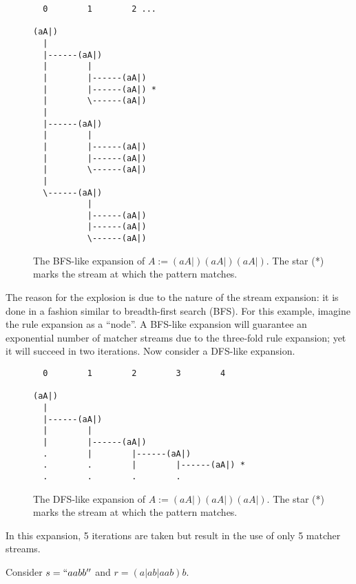 \begin{figure}[h]
\begin{center}
\begin{BVerbatim}
  0        1        2 ...

(aA|)
  |
  |------(aA|)
  |        |
  |        |------(aA|)
  |        |------(aA|) *
  |        \------(aA|)
  |
  |------(aA|)
  |        |
  |        |------(aA|)
  |        |------(aA|)
  |        \------(aA|)
  |
  \------(aA|)
           |
           |------(aA|)
           |------(aA|)
           \------(aA|)
\end{BVerbatim}
\end{center}
\caption{The BFS-like expansion of $A := (aA|)(aA|)(aA|)$. The star 
(*) marks the stream at which the pattern matches.}
\end{figure}


The reason for the explosion is due to the nature of the stream expansion: it
is done in a fashion similar to breadth-first search (BFS).  For this example,
imagine the rule expansion as a ``node''.  A BFS-like expansion will guarantee
an exponential number of matcher streams due to the three-fold rule expansion;
yet it will succeed in two iterations.  Now consider a DFS-like expansion.

\begin{figure}[h]
\begin{center}
\begin{BVerbatim}
  0        1        2        3        4

(aA|)
  |
  |------(aA|)
  |        |
  |        |------(aA|)
  .        |        |------(aA|)
  .        .        |        |------(aA|) *
  .        .        .        .
\end{BVerbatim}
\end{center}
\caption{The DFS-like expansion of $A := (aA|)(aA|)(aA|)$. The star 
(*) marks the stream at which the pattern matches.}
\end{figure}

In this expansion, 5 iterations are taken but result in the use of only 5
matcher streams. 



\pagebreak

Consider $s = ``aabb''$ and $r = (a|ab|aab)b$.

